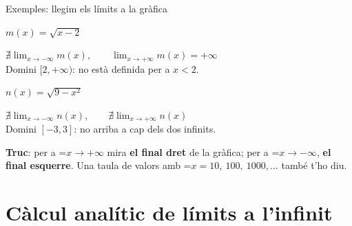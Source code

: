 \documentclass[11pt,a4paper]{article}
\newcommand{\fmm}[1]{\setbox0=\hbox{$#1$}\ifdim\wd0>\linewidth\fmdisp{#1}\else\mbox{\box0}\fi}
\newcommand{\fmdisp}[1]{\[\setbox2=\hbox{$\displaystyle #1$}\ifdim\wd2>\linewidth\resizebox{\linewidth}{!}{\box2}\else\box2\fi\]}
\newcommand{\fmuline}[1]{\textbf{\color{fmaccent}#1}}
\begin{document}
\begin{fmexfill}{Exemples: llegim els límits a la gràfica}
\begin{minipage}[t][\tcbtextheight][s]{\linewidth}
\noindent \begin{minipage}[t]{0.48\linewidth}\centering $m(x)=\sqrt{x-2}$\par\smallskip {}\par\smallskip $\displaystyle\nexists\lim_{x\to-\infty}m(x),\qquad\lim_{x\to+\infty}m(x)=+\infty$\\ \vspace*{0.2cm} Domini $[2,+\infty)$: no està definida per a $x<2$.\end{minipage}\hfill\begin{minipage}[t]{0.48\linewidth}\centering $n(x)=\sqrt{9-x^2}$\par\smallskip {}\par\smallskip $\displaystyle\nexists\lim_{x\to-\infty}n(x),\qquad\nexists\lim_{x\to+\infty}n(x)$\\ \vspace*{0.2cm} Domini $[-3,3]$: no arriba a cap dels dos infinits.\end{minipage}\par
\vfill

      
\begin{fmnote}\fmuline{Truc}: per a \fmm{x\to+\infty} mira \textbf{el final dret} de la gràfica; per a \fmm{x\to-\infty}, \textbf{el final esquerre}. Una taula de valors amb \fmm{x=10,\ 100,\ 1000,\dots} també t'ho diu.\end{fmnote}
\end{minipage}
\end{fmexfill}

\section{Càlcul analític de límits a l'infinit}\hypertarget{sec2}{}
\end{document}

